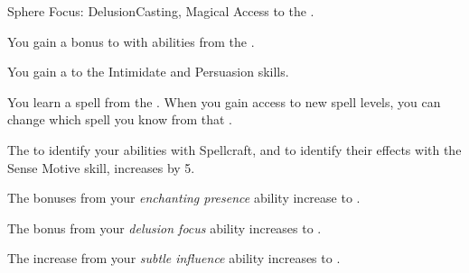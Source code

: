     \begin{feat}{Sphere Focus: Delusion}{Casting, Magical}
        \featpre Access to the  .

         You gain a  bonus to  with abilities from the  .

         You gain a   to the Intimidate and Persuasion skills.

         You learn a spell from the  .
        When you gain access to new spell levels, you can change which spell you know from that .

         The  to identify your  abilities with Spellcraft, and to identify their effects with the Sense Motive skill, increases by 5.

         The bonuses from your \textit{enchanting presence} ability increase to .

         The bonus from your \textit{delusion focus} ability increases to .

         The  increase from your \textit{subtle influence} ability increases to .
    \end{feat}

